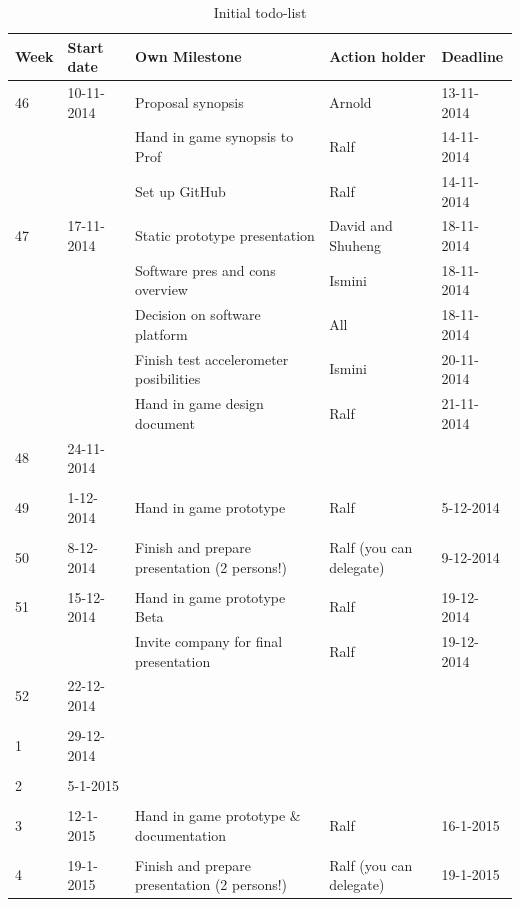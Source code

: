 \documentclass[a4paper,11pt,notitlepage]{report}
\begin{document}
\begin{table}
\begin{tabular*}{1.075\textwidth}{ | l | l | l | l | l | }
\hline
	Week & Start date & Own Milestone & Action holder & Deadline \\ \hline
	46 & 10-11-2014 & Proposal synopsis & Arnold & 13-11-2014 \\ \hline
	 &  & Hand in game synopsis to Prof & Ralf & 14-11-2014 \\ \hline
	 &  & Set up GitHub & Ralf & 14-11-2014 \\ \hline
	47 & 17-11-2014 & Static prototype presentation & David and Shuheng & 18-11-2014 \\ \hline
	 &  & Software pres and cons overview & Ismini & 18-11-2014 \\ \hline
	 &  & Decision on software platform & All & 18-11-2014 \\ \hline
	 &  & Finish test accelerometer posibilities & Ismini & 20-11-2014 \\ \hline
	 &  & Hand in game design document & Ralf & 21-11-2014 \\ \hline
	48 & 24-11-2014 &  &  &  \\ \hline
	 &  &  &  &  \\ \hline
	49 & 1-12-2014 & Hand in game prototype & Ralf & 5-12-2014 \\ \hline
	 &  &  &  &  \\ \hline
	50 & 8-12-2014 & Finish and prepare presentation (2 persons!) & Ralf (you can delegate) & 9-12-2014 \\ \hline
	 &  &  &  &  \\ \hline
	51 & 15-12-2014 & Hand in game prototype Beta & Ralf & 19-12-2014 \\ \hline
	 &  & Invite company for final presentation & Ralf & 19-12-2014 \\ \hline
	52 & 22-12-2014 &  &  &  \\ \hline
	 &  &  &  &  \\ \hline
	1 & 29-12-2014 &  &  &  \\ \hline
	 &  &  &  &  \\ \hline
	2 & 5-1-2015 &  &  &  \\ \hline
	 &  &  &  &  \\ \hline
	3 & 12-1-2015 & Hand in game prototype \& documentation & Ralf & 16-1-2015 \\ \hline
	 &  &  &  &  \\ \hline
	4 & 19-1-2015 & Finish and prepare presentation (2 persons!) & Ralf (you can delegate) & 19-1-2015 \\ \hline
\end{tabular*}	
	\caption{Initial todo-list}
	\label{tab:todolist}
\end{table}
\end{document}
